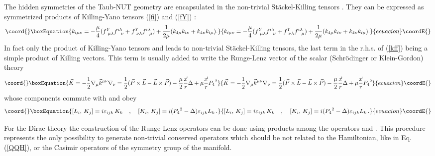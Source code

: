 \documentclass[a4paper,12pt]{article}
\begin{document}
The hidden symmetries of the Taub-NUT geometry are encapsulated in 
the non-trivial St\" ackel-Killing tensors \coordHE{}.
They can be expressed as symmetrized products of Killing-Yano tensors 
(\ref{fi}) and  (\ref{fY}) \cite{VV}:
\begin{equation}\coord{}\boxEquation{\label{kff}
k_{i\mu\nu} = -{\mu\over 4}(f^Y_{~\mu\lambda}f^{i\lambda}_{~~\nu} +
f^Y_{~\nu\lambda}f^{i\lambda}_{~~\mu})+{1\over 2\mu}(k_{4\mu}k_{i\nu} +
k_{4\nu}k_{i\mu}).
}{k_{i\mu\nu} = -{\mu\over 4}(f^Y_{~\mu\lambda}f^{i\lambda}_{~~\nu} +
f^Y_{~\nu\lambda}f^{i\lambda}_{~~\mu})+{1\over 2\mu}(k_{4\mu}k_{i\nu} +
k_{4\nu}k_{i\mu}).
}{ecuacion}\coordE{}\end{equation}
In fact only the product of Killing-Yano tensors \coordHE{} and \coordHE{} leads 
to non-trivial St\" ackel-Killing tensors, the last term in the r.h.s. 
of (\ref{kff}) being a simple product of Killing vectors. This term is 
usually added to write the Runge-Lenz vector of the scalar (Schr\" odinger 
or Klein-Gordon) theory \cite{GRFH,CV1}
\begin{equation}\coord{}\boxEquation{\label{RLorb}   
\vec{K}=-\frac{1}{2}\nabla_{\mu}\vec{k}^{\mu\nu}\nabla_{\nu}=
\frac{1}{2}(\vec{P}\times \vec{L}-\vec{L}\times \vec{P})-
\frac{\mu}{2}\frac{\vec{x}}{r}\Delta +\mu\frac{\vec{x}}{r}{P_{4}}^{2}
}{\vec{K}=-\frac{1}{2}\nabla_{\mu}\vec{k}^{\mu\nu}\nabla_{\nu}=
\frac{1}{2}(\vec{P}\times \vec{L}-\vec{L}\times \vec{P})-
\frac{\mu}{2}\frac{\vec{x}}{r}\Delta +\mu\frac{\vec{x}}{r}{P_{4}}^{2}
}{ecuacion}\coordE{}\end{equation}
whose components commute with \myHighlight{$\Delta$}\coordHE{} and obey 
\begin{equation}\coord{}\boxEquation{\label{comk}
\left[ L_{i},\, K_{j} \right] = i \varepsilon_{ijk}\,K_{k}~~~,~~~ 
\left[ K_{i},\, K_{j} \right] = i ({P_4}^2-\Delta)\varepsilon_{ijk}L_{k}\,. 
}{\left[ L_{i},\, K_{j} \right] = i \varepsilon_{ijk}\,K_{k}~~~,~~~ 
\left[ K_{i},\, K_{j} \right] = i ({P_4}^2-\Delta)\varepsilon_{ijk}L_{k}\,. 
}{ecuacion}\coordE{}\end{equation}

For the Dirac theory the construction of the Runge-Lenz operators can 
be done using products among the operators \coordHE{} and \coordHE{}. This 
procedure represents the only possibility to generate non-trivial 
conserved operators which should be not related to the Hamiltonian, like in 
Eq.(\ref{QQH}), or the Casimir operators of the symmetry group of the 
manifold.
\end{document}
